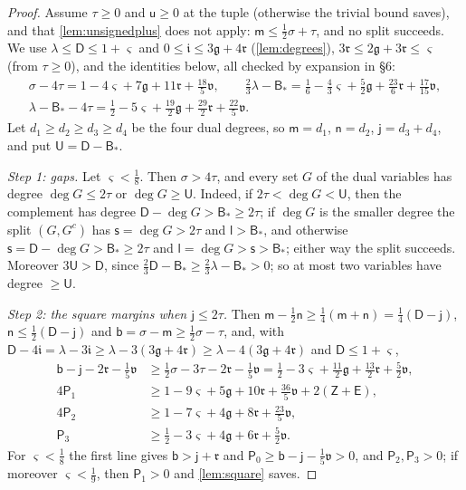 \documentclass[11pt,colorlinks]{charlie}
\begin{document}
\begin{proof}
Assume $\tau\ge0$ and $\mathsf u\ge0$ at the tuple (otherwise the trivial bound saves), and that \cref{lem:unsignedplus} does not apply: $\mathsf m\le\frac12\sigma+\tau$, and no split succeeds. We use $\lambda\le\mathsf D\le1+\varsigma$ and $0\le\mathfrak i\le3\mathfrak g+4\mathfrak r$ (\cref{lem:degrees}), $3\mathfrak r\le2\mathfrak g+3\mathfrak r\le\varsigma$ (from $\tau\ge0$), and the identities below, all checked by expansion in \S6:
\[
 \begin{gathered}
 \sigma-4\tau=1-4\varsigma+7\mathfrak g+11\mathfrak r+\tfrac{18}5\mathfrak v,\qquad
 \tfrac23\lambda-\mathsf B_*=\tfrac16-\tfrac43\varsigma+\tfrac52\mathfrak g+\tfrac{23}6\mathfrak r+\tfrac{17}{15}\mathfrak v,\\
 \lambda-\mathsf B_*-4\tau=\tfrac12-5\varsigma+\tfrac{19}2\mathfrak g+\tfrac{29}2\mathfrak r+\tfrac{22}5\mathfrak v .
 \end{gathered}
\]
Let $d_1\ge d_2\ge d_3\ge d_4$ be the four dual degrees, so $\mathsf m=d_1$, $\mathsf n=d_2$, $\mathsf j=d_3+d_4$, and put $\mathsf U=\mathsf D-\mathsf B_*$.

\emph{Step 1: gaps.} Let $\varsigma<\frac18$. Then $\sigma>4\tau$, and every set $G$ of the dual variables has degree $\deg G\le2\tau$ or $\deg G\ge\mathsf U$. Indeed, if $2\tau<\deg G<\mathsf U$, then the complement has degree $\mathsf D-\deg G>\mathsf B_*\ge2\tau$; if $\deg G$ is the smaller degree the split $(G,G^c)$ has $\mathsf s=\deg G>2\tau$ and $\mathsf l>\mathsf B_*$, and otherwise $\mathsf s=\mathsf D-\deg G>\mathsf B_*\ge2\tau$ and $\mathsf l=\deg G>\mathsf s>\mathsf B_*$; either way the split succeeds. Moreover $3\mathsf U>\mathsf D$, since $\frac23\mathsf D-\mathsf B_*\ge\frac23\lambda-\mathsf B_*>0$; so at most two variables have degree $\ge\mathsf U$.

\emph{Step 2: the square margins when $\mathsf j\le2\tau$.} Then $\mathsf m-\frac12\mathsf n\ge\frac14(\mathsf m+\mathsf n)=\frac14(\mathsf D-\mathsf j)$, $\mathsf n\le\frac12(\mathsf D-\mathsf j)$ and $\mathsf b=\sigma-\mathsf m\ge\frac12\sigma-\tau$, and, with $\mathsf D-4\mathfrak i=\lambda-3\mathfrak i\ge\lambda-3(3\mathfrak g+4\mathfrak r)\ge\lambda-4(3\mathfrak g+4\mathfrak r)$ and $\mathsf D\le1+\varsigma$,
\[
 \begin{aligned}
 \mathsf b-\mathsf j-2\mathfrak r-\tfrac15\mathfrak v&\ge\tfrac12\sigma-3\tau-2\mathfrak r-\tfrac15\mathfrak v=\tfrac12-3\varsigma+\tfrac{11}2\mathfrak g+\tfrac{13}2\mathfrak r+\tfrac52\mathfrak v,\\
 4\mathsf P_1&\ge1-9\varsigma+5\mathfrak g+10\mathfrak r+\tfrac{36}5\mathfrak v+2(\mathsf Z+\mathsf E),\\
 4\mathsf P_2&\ge1-7\varsigma+4\mathfrak g+8\mathfrak r+\tfrac{23}5\mathfrak v,\\
 \mathsf P_3&\ge\tfrac12-3\varsigma+4\mathfrak g+6\mathfrak r+\tfrac52\mathfrak v .
 \end{aligned}
\]
For $\varsigma<\frac18$ the first line gives $\mathsf b>\mathsf j+\mathfrak r$ and $\mathsf P_0\ge\mathsf b-\mathsf j-\frac15\mathfrak v>0$, and $\mathsf P_2,\mathsf P_3>0$; if moreover $\varsigma<\frac19$, then $\mathsf P_1>0$ and \cref{lem:square} saves.


\end{proof}
\end{document}
